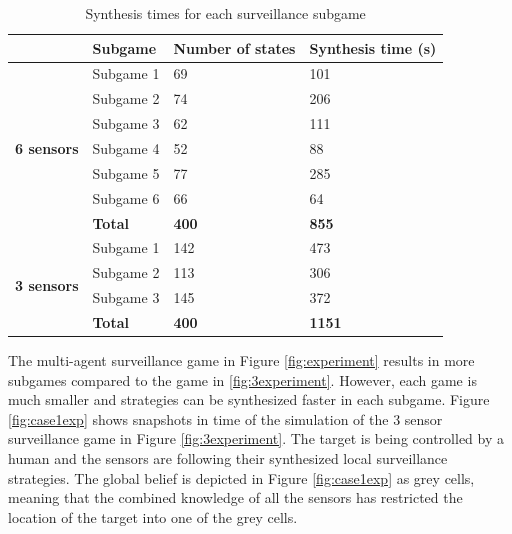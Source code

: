 \begin{table}[h!]
\vspace{-0.2cm}
	\centering
	\caption{Synthesis times for each surveillance subgame}
	\label{tab:synthtime}
	\begin{tabular}{c|l|l|l}
		\multicolumn{1}{l|}{}                                    & \textbf{Subgame} & \textbf{Number of states} & \textbf{Synthesis time (s)} \\ \hline \hline
		\multirow{7}{*}{\textbf{6 sensors}}
		& Subgame 1   & 69     & 101                          \\
	    & Subgame 2   & 74     & 206                          \\
		& Subgame 3   & 62     & 111                          \\
		& Subgame 4   & 52     & 88                          \\
		& Subgame 5   & 77     & 285                          \\
		& Subgame 6   & 66     & 64                          \\ \hline
		& \textbf{Total}   & \textbf{400}         & \textbf{855}                         \\ \hline
		\multicolumn{1}{l|}{\multirow{4}{*}{\textbf{3 sensors}}} & Subgame 1        & 142 & 473                         \\
		\multicolumn{1}{l|}{}                                    & Subgame 2        & 113 & 306                         \\
		\multicolumn{1}{l|}{}                                    & Subgame 3        & 145 & 372                         \\ \hline
		\multicolumn{1}{l|}{}                                    &  \textbf{Total} & \textbf{400}            & \textbf{1151}                        
	\end{tabular}
\end{table}
\vspace{-0.2cm}
The multi-agent surveillance game in Figure \ref{fig:experiment} results in more subgames compared to the game in \ref{fig:3experiment}. However, each game is much smaller and strategies can be synthesized faster in each subgame. Figure \ref{fig:case1exp} shows snapshots in time of the simulation of the 3 sensor surveillance game in Figure \ref{fig:3experiment}. The target is being controlled by a human and the sensors are following their synthesized local surveillance strategies. The global belief is depicted in Figure \ref{fig:case1exp} as grey cells, meaning that the combined knowledge of all the sensors has restricted the location of the target into one of the grey cells.
